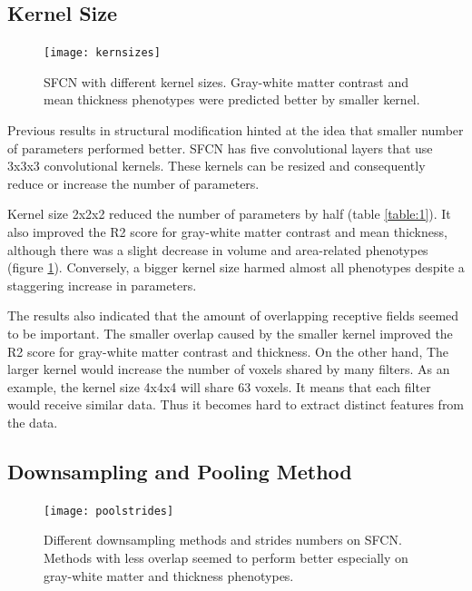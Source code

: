\documentclass{article}
\begin{document}
    \subsection*{Kernel Size}
    
    \begin{figure}[h]
        \centering
        \texttt{[image: kernsizes]}
        \centering
        \caption{
            SFCN with different kernel sizes. 
            Gray-white matter contrast and mean thickness phenotypes were predicted better by smaller kernel.}
        \label{fig:kernsizes}
    \end{figure}

    Previous results in structural modification hinted at the idea that smaller number of parameters performed better. 
    SFCN has five convolutional layers that use 3x3x3 convolutional kernels. 
    These kernels can be resized and consequently reduce or increase the number of parameters. 

    Kernel size 2x2x2 reduced the number of parameters by half (table \ref{table:1}). 
    It also improved the R2 score for gray-white matter contrast and mean thickness, although there was a slight decrease in volume and area-related phenotypes (figure \ref{fig:kernsizes}). 
    Conversely, a bigger kernel size harmed almost all phenotypes despite a staggering increase in parameters.

    The results also indicated that the amount of overlapping receptive fields seemed to be important. 
    The smaller overlap caused by the smaller kernel improved the R2 score for gray-white matter contrast and thickness. 
    On the other hand, The larger kernel would increase the number of voxels shared by many filters. 
    As an example, the kernel size 4x4x4 will share 63 voxels. 
    It means that each filter would receive similar data. 
    Thus it becomes hard to extract distinct features from the data.


    \subsection*{Downsampling and Pooling Method}
    
    \begin{figure}[h]
        \centering
        \texttt{[image: poolstrides]}
        \centering
        \caption{
            Different downsampling methods and strides numbers on SFCN. 
            Methods with less overlap seemed to perform better especially on gray-white matter and thickness phenotypes.}
        \label{fig:poolstrides}
    \end{figure}
\end{document}
